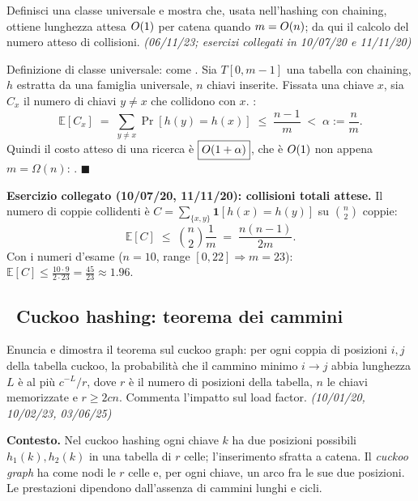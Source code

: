 \begin{domanda}
Definisci una classe universale e mostra che, usata nell'hashing con chaining, ottiene lunghezza
attesa $O\!\left(1\right)$ per catena quando $m=O\!\left(n\right)$; da qui il calcolo del numero atteso di collisioni.
\emph{(06/11/23; esercizi collegati in 10/07/20 e 11/11/20)}
\end{domanda}

Definizione di classe universale: come . Sia $T[0,m-1]$ una tabella con chaining, $h$
estratta da una famiglia universale, $n$ chiavi inserite. Fissata una chiave $x$, sia $C_x$ il
numero di chiavi $y\ne x$ che collidono con $x$. :
\[
\mathbb{E}[C_x]\;=\;\sum_{y\ne x}\Pr[h(y)=h(x)]\;\le\;\frac{n-1}{m}\;<\;\alpha:=\frac{n}{m}.
\]
Quindi il costo atteso di una ricerca \`e $\boxed{O\!\left(1+\alpha\right)}$, che \`e $O\!\left(1\right)$ non appena
$m=\Omega(n)$: .
$\blacksquare$

\textbf{Esercizio collegato (10/07/20, 11/11/20): collisioni totali attese.} Il numero di coppie
collidenti \`e $C=\sum_{\{x,y\}}\mathbf{1}[h(x)=h(y)]$ su $\binom{n}{2}$ coppie:
\[
\mathbb{E}[C]\;\le\;\binom{n}{2}\frac{1}{m}\;=\;\frac{n(n-1)}{2m}.
\]
Con i numeri d'esame ($n=10$, range $[0,22]\Rightarrow m=23$):
$\mathbb{E}[C]\le\frac{10\cdot9}{2\cdot23}=\frac{45}{23}\approx1.96$.

\subsection*{\hot\ Cuckoo hashing: teorema dei cammini}

\begin{domanda}
Enuncia e dimostra il teorema sul cuckoo graph: per ogni coppia di posizioni $i,j$ della tabella
cuckoo, la probabilit\`a che il cammino minimo $i\to j$ abbia lunghezza $L$ \`e al pi\`u
$c^{-L}/r$, dove $r$ \`e il numero di posizioni della tabella, $n$ le chiavi memorizzate e
$r\ge 2cn$. Commenta l'impatto sul load factor. \emph{(10/01/20, 10/02/23, 03/06/25)}
\end{domanda}

\textbf{Contesto.} Nel cuckoo hashing ogni chiave $k$ ha due posizioni possibili
$h_1(k),h_2(k)$ in una tabella di $r$ celle; l'inserimento sfratta a catena. Il \emph{cuckoo
graph} ha come nodi le $r$ celle e, per ogni chiave, un arco fra le sue due posizioni. Le
prestazioni dipendono dall'assenza di cammini lunghi e cicli.

